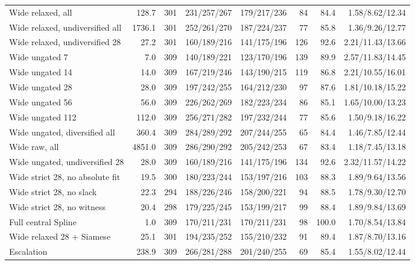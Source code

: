 \begin{tabular}{lrrrrrrr}
Wide relaxed, all & 128.7 & 301 & 231/257/267 & 179/217/236 & 84 & 84.4 & 1.58/8.62/12.34 \\
Wide relaxed, undiversified all & 1736.1 & 301 & 252/261/270 & 187/224/237 & 77 & 85.8 & 1.36/9.26/12.77 \\
Wide relaxed, undiversified 28 & 27.2 & 301 & 160/189/216 & 141/175/196 & 126 & 92.6 & 2.21/11.43/13.66 \\
Wide ungated 7 & 7.0 & 309 & 140/189/221 & 123/170/196 & 139 & 89.9 & 2.57/11.83/14.45 \\
Wide ungated 14 & 14.0 & 309 & 167/219/246 & 143/190/215 & 119 & 86.8 & 2.21/10.55/16.01 \\
Wide ungated 28 & 28.0 & 309 & 197/242/255 & 164/212/230 & 97 & 87.6 & 1.81/10.18/15.22 \\
Wide ungated 56 & 56.0 & 309 & 226/262/269 & 182/223/234 & 86 & 85.1 & 1.65/10.00/13.23 \\
Wide ungated 112 & 112.0 & 309 & 256/271/282 & 197/232/244 & 77 & 85.6 & 1.50/9.18/16.22 \\
Wide ungated, diversified all & 360.4 & 309 & 284/289/292 & 207/244/255 & 65 & 84.4 & 1.46/7.85/12.44 \\
Wide raw, all & 4851.0 & 309 & 286/290/292 & 205/242/253 & 67 & 83.4 & 1.18/7.45/13.18 \\
Wide ungated, undiversified 28 & 28.0 & 309 & 160/189/216 & 141/175/196 & 134 & 92.6 & 2.32/11.57/14.22 \\
Wide strict 28, no absolute fit & 19.5 & 300 & 180/223/244 & 153/197/216 & 103 & 88.3 & 1.89/9.64/13.56 \\
Wide strict 28, no slack & 22.3 & 294 & 188/226/246 & 158/200/221 & 94 & 88.5 & 1.78/9.30/12.70 \\
Wide strict 28, no witness & 20.4 & 298 & 179/225/245 & 153/199/217 & 99 & 88.4 & 1.89/9.84/13.69 \\
Full central Spline & 1.0 & 309 & 170/211/231 & 170/211/231 & 98 & 100.0 & 1.70/8.54/13.84 \\
Wide relaxed 28 + Siamese & 25.1 & 301 & 194/235/252 & 155/210/232 & 91 & 89.4 & 1.87/8.70/13.16 \\
Escalation & 238.9 & 309 & 266/281/288 & 201/240/255 & 69 & 85.4 & 1.55/8.02/12.44 \\
\bottomrule
\end{tabular}
